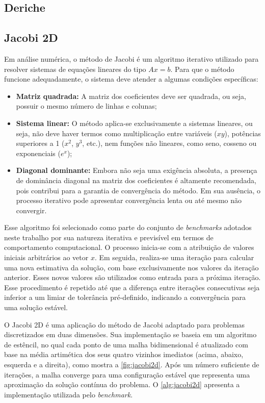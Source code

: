 \subsection{Deriche}\label{subsec:deriche}

\subsection{Jacobi 2D}\label{subsec:jacobi2d}

Em análise numérica, o método de Jacobi é um algoritmo iterativo utilizado para resolver sistemas de equações lineares do tipo $Ax = b$. Para que o método funcione adequadamente, o sistema deve atender a algumas condições específicas:

\begin{itemize}
	\item \textbf{Matriz quadrada:} A matriz dos coeficientes deve ser quadrada, ou seja, possuir o mesmo número de linhas e colunas;
	\item \textbf{Sistema linear:} O método aplica-se exclusivamente a sistemas lineares, ou seja, não deve haver termos como multiplicação entre variáveis ($xy$), potências superiores a 1 ($x^2$, $y^3$, etc.), nem funções não lineares, como seno, cosseno ou exponenciais ($e^x$);
	\item \textbf{Diagonal dominante:} Embora não seja uma exigência absoluta, a presença de dominância diagonal na matriz dos coeficientes é altamente recomendada, pois contribui para a garantia de convergência do método. Em sua ausência, o processo iterativo pode apresentar convergência lenta ou até mesmo não convergir.
\end{itemize}

Esse algoritmo foi selecionado como parte do conjunto de \textit{benchmarks} adotados neste trabalho por sua natureza iterativa e previsível em termos de comportamento computacional. O processo inicia-se com a atribuição de valores iniciais arbitrários ao vetor $x$. Em seguida, realiza-se uma iteração para calcular uma nova estimativa da solução, com base exclusivamente nos valores da iteração anterior. Esses novos valores são utilizados como entrada para a próxima iteração. Esse procedimento é repetido até que a diferença entre iterações consecutivas seja inferior a um limiar de tolerância pré-definido, indicando a convergência para uma solução estável.

O Jacobi 2D é uma aplicação do método de Jacobi adaptado para problemas discretizados em duas dimensões. Sua implementação se baseia em um algoritmo de estêncil, no qual cada ponto de uma malha bidimensional é atualizado com base na média artimética dos seus quatro vizinhos imediatos (acima, abaixo, esquerda e a direita), como mostra a \autoref{fig:jacobi2d}. Após um número suficiente de iterações, a malha converge para uma configuração estável que representa uma aproximação da solução contínua do problema. O \autoref{alg:jacobi2d} apresenta a implementação utilizada pelo \textit{benchmark}.

